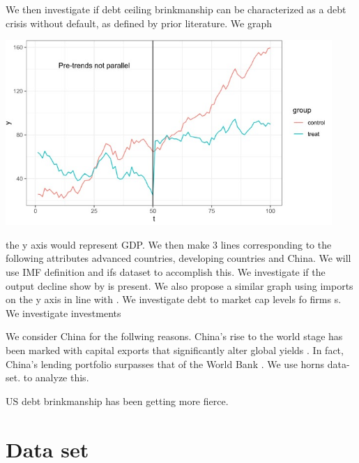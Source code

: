 \documentclass[
  12pt]{article}
\begin{document}
We then investigate if debt ceiling brinkmanship can be characterized as
a debt crisis without default, as defined by prior literature. We graph

\includegraphics[width=4.875in,height=\textheight]{style-guide/1_year_ERP_parallel_trends.jpeg}

the y axis would represent GDP. We then make 3 lines corresponding to
the following attributes advanced countries, developing countries and
China. We will use IMF definition and ifs dataset to accomplish this. We
investigate if the output decline show by \citep{yeyati2011} is present.
We also propose a similar graph using imports on the y axis in line with
\citep{mendoza2012}. We investigate debt to market cap levels fo firms
\citep{corsetti2012, das2010, gourinchas2016}s. We investigate
investments \citep{almeida2017}

We consider China for the follwing reasons. China's rise to the world
stage has been marked with capital exports that significantly alter
global yields \citep{alfaro2014, gourinchas}. In fact, China's lending
portfolio surpasses that of the World Bank \citep{horn2021} . We use
horns data-set. to analyze this.

US debt brinkmanship has been getting more fierce.

\hypertarget{sec-dataset}{%
\section{Data set}\label{sec-dataset}}


\renewcommand\refname{References}
  
\end{document}
